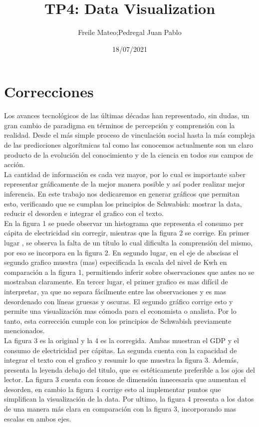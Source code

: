 \documentclass{article}
\title{TP4: Data Visualization}
\author{Freile Mateo;Pedregal Juan Pablo }
\date{18/07/2021}
\begin{document}
\maketitle

\section{Correcciones}

Los avances tecnológicos de las últimas décadas han representado, sin dudas, un  gran cambio de paradigma en términos de percepción y comprensión con la realidad. Desde el más simple proceso de vinculación social hasta la más compleja de las predicciones algorítmicas tal como las conocemos actualmente son  un claro producto de la evolución del conocimiento y de la ciencia en todos sus campos de acción.\\

La cantidad de información es cada vez mayor, por lo cual es importante saber representar gráficamente de la mejor manera posible y así poder realizar mejor inferencia.
En este trabajo nos dedicaremos en generar gráficos que permitan esto, verificando que se cumplan los principios de Schwabish: mostrar la data, reducir el desorden e integrar el grafico con el texto.\\

En la figura 1 se puede observar un histograma que representa el consumo per cápita de electricidad sin corregir, mientras que la figura 2 se corrige. En primer lugar , se observa la falta de un título  lo cual dificulta la comprensión del mismo, por eso se incorpora en la figura 2. En segundo lugar, en el eje de abscisas el segundo grafico muestra (mas) especificada la escala del nivel de Kwh en comparación a la figura 1, permitiendo inferir sobre observaciones que antes no se mostraban claramente. En tercer lugar, el primer grafico es mas difícil de interpretar, ya que no separa fácilmente entre las observaciones y es mas desordenado con líneas gruesas y oscuras. El segundo gráfico corrige esto y permite una visualización mas cómoda para el economista o analista.  Por lo tanto, esta corrección cumple con los principios de Schwabish previamente mencionados.\\


La figura 3 es la original y la 4 es la corregida. Ambas muestran el GDP y el consumo de electricidad per cápitas. La segunda cuenta con la capacidad de integrar el texto con el grafico y resumir lo que muestra la figura 3. Además, presenta la leyenda debajo del titulo, que es estéticamente preferible a los ojos del lector. La figura 3 cuenta con íconos de dimensión innecesaria que aumentan el desorden, en cambio la figura 4 corrige esto al implementar puntos que simplifican la visualización de la data. Por ultimo, la figura 4 presenta a los datos de una manera más clara en comparación con la figura 3, incorporando mas escalas en ambos ejes.\\
\end{document}
